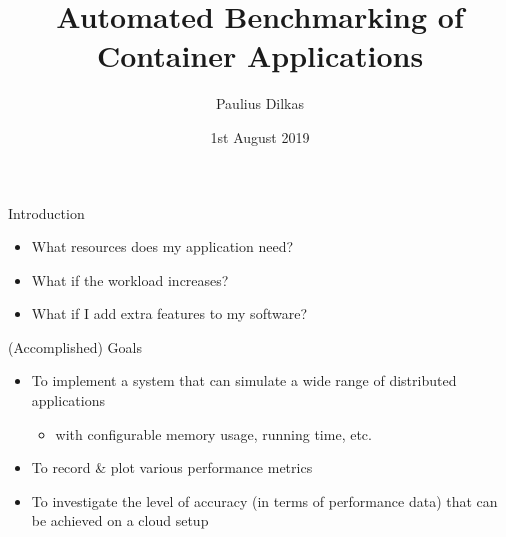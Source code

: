 \documentclass{beamer}
\author{Paulius Dilkas}
\title[Automated Benchmarking]{Automated Benchmarking of Container Applications}
\date{1st August 2019}
\begin{document}
\maketitle

\begin{frame}{Introduction}
  \begin{itemize}
  \item What resources does my application need?
  \item What if the workload increases?
  \item What if I add extra features to my software?
  \end{itemize}
  \begin{block}{(Accomplished) Goals}
    \begin{itemize}
    \item To implement a system that can simulate a wide range of distributed
      applications
      \begin{itemize}
      \item with configurable memory usage, running time, etc.
      \end{itemize}
    \item To record \& plot various performance metrics
    \item To investigate the level of accuracy (in terms of performance
      data) that can be achieved on a cloud setup
    \end{itemize}
  \end{block}
\end{frame}
\end{document}
